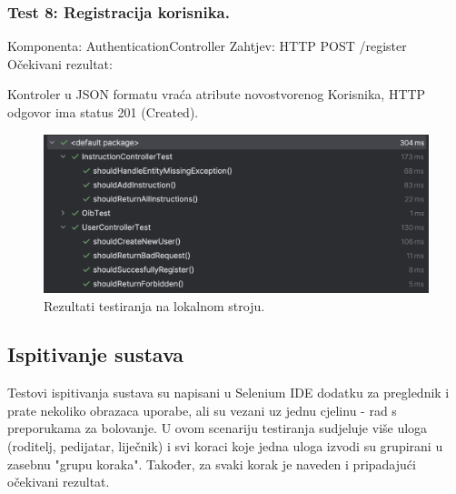 			\subsubsection*{Test 8: Registracija korisnika.}
			Komponenta: AuthenticationController \newline
			Zahtjev: HTTP POST /register \newline
			Očekivani rezultat:
			\begin{packed_item}
				\item Kontroler u JSON formatu vraća atribute novostvorenog Korisnika, HTTP odgovor ima status 201 (Created).
			\end{packed_item}
			

			\begin{figure}[H]
				\includegraphics[width=\textwidth]{slike/testing_results.png} 
				\caption{Rezultati testiranja na lokalnom stroju.} 
			\end{figure}
			
			\subsection{Ispitivanje sustava}
			Testovi ispitivanja sustava su napisani u Selenium IDE dodatku za preglednik i prate nekoliko obrazaca uporabe, ali su vezani uz jednu cjelinu - rad s preporukama za bolovanje.
			U ovom scenariju testiranja sudjeluje više uloga (roditelj, pedijatar, liječnik) i svi koraci koje jedna uloga izvodi su grupirani u zasebnu "grupu koraka". Također, za svaki korak je
			naveden i pripadajući očekivani rezultat.
			
